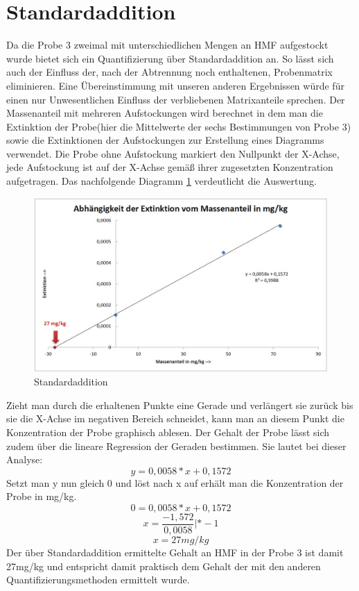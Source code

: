 \section{Standardaddition}
Da die Probe 3 zweimal mit unterschiedlichen Mengen an HMF aufgestockt wurde bietet sich ein Quantifizierung über Standardaddition an. So lässt sich auch der Einfluss der, nach der Abtrennung noch enthaltenen, Probenmatrix eliminieren. Eine Übereinstimmung mit unseren anderen Ergebnissen würde für einen nur Unwesentlichen Einfluss der verbliebenen Matrixanteile sprechen. Der Massenanteil mit mehreren Aufstockungen wird berechnet in dem man die Extinktion der Probe(hier die Mittelwerte der sechs Bestimmungen von Probe 3) sowie die Extinktionen der Aufstockungen zur Erstellung eines Diagramms verwendet. Die Probe ohne Aufstockung markiert den Nullpunkt der X-Achse, jede Aufstockung ist auf der X-Achse gemäß ihrer zugesetzten Konzentration aufgetragen. Das nachfolgende Diagramm \ref{fig:Standardaddidtion} verdeutlicht die Auswertung. 
\begin{figure}[htbp]
	\centering
		\includegraphics[width=1.00\textwidth]{../Bilder/Standardaddidtion.JPG}
	\caption{Standardaddition}
	\label{fig:Standardaddidtion}
\end{figure}


Zieht man durch die erhaltenen Punkte eine Gerade und verlängert sie zurück bis sie die X-Achse im negativen Bereich schneidet, kann man an diesem Punkt die Konzentration der Probe graphisch ablesen. Der Gehalt der Probe lässt sich zudem über die lineare Regression der Geraden bestimmen. Sie lautet bei dieser Analyse:
	\[y=0,0058*x+0,1572\] 
Setzt man y nun gleich 0 und löst nach x auf erhält man die Konzentration der Probe in mg/kg.
 	\[0=0,0058*x+0,1572\] 
	\[x=\frac{ -1,572 }{ 0,0058 }   |*-1\] 
	\[x=27mg/kg\] 
Der über Standardaddition ermittelte Gehalt an HMF in der Probe 3 ist damit 27mg/kg und entspricht damit praktisch dem Gehalt der mit den anderen Quantifizierungsmethoden ermittelt wurde.